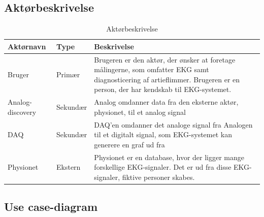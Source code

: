 \subsection{Aktørbeskrivelse}

\begin{table}[H]
\begin{tabularx}{\textwidth}{l l X}
     Aktørnavn  & Type      & Beskrivelse \\ \midrule
     Bruger   & Primær    & Brugeren er den aktør, der ønsker at foretage målingerne, som omfatter EKG samt diagnosticering af artieflimmer. Brugeren er en person, der har kendskab til EKG-systemet. \\ 						  									  \addlinespace[2mm]
     Analog-discovery & Sekundær  & Analog omdanner data fra den eksterne aktør, physionet, til et analog signal \\ 
     	\addlinespace[2mm]
     DAQ & Sekundær  & DAQ'en omdanner det analoge signal fra Analogen til et digitalt signal, som EKG-systemet kan generere en graf ud fra  \\ 
     	\addlinespace[2mm]
     Physionet & Ekstern 	& Physionet er en database, hvor der ligger mange forskellige EKG-signaler. Det er ud fra disse EKG-signaler, fiktive personer skabes.\\	                                                                                                                                                                           
   
     \bottomrule                                                                                                                   
    \end{tabularx}
    \caption {Aktørbeskrivelse}
    \label{tab:aktoerbeskrivelse}
	
\end{table}

\subsection{Use case-diagram}

